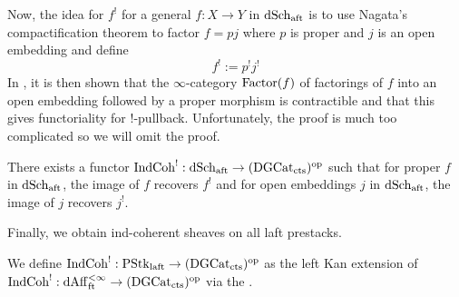 \documentclass[./main.tex]{subfiles}
\begin{document}
Now, the idea for $f^!$ for a general $f : X \to Y$ in $\mathrm{dSch}_{\mathrm{aft}}$
is to use Nagata's compactification theorem
\cite[Thm 38.33.8]{stacks} to factor $f = p j$ where
$p$ is proper and $j$ is an open embedding and define \[
  f^! := p^! j^!  
\]
In \cite[Ch 5 , 2.1]{GR1},
it is then shown that the $\infty$-category $\mathrm{Factor}(f)$ of
factorings of $f$ into an open embedding followed by a proper morphism
is contractible and that
this gives functoriality for !-pullback.
Unfortunately, the proof is much too complicated so
we will omit the proof.

\begin{prop}
  
  There exists a functor $\mathrm{IndCoh}^! : \mathrm{dSch}_{\mathrm{aft}} \to (\mathrm{DGCat}_{\mathrm{cts}})^{\mathrm{op}}$
  such that for proper $f$ in $\mathrm{dSch}_{\mathrm{aft}}$,
  the image of $f$ recovers $f^!$ and for open embeddings $j$ in $\mathrm{dSch}_{\mathrm{aft}}$,
  the image of $j$ recovers $j^!$.
  \cite[Ch 5 , 3.1.4]{GR1}
\end{prop}

Finally, we obtain ind-coherent sheaves on all laft prestacks.

\begin{dfn}
  
  We define $\mathrm{IndCoh}^! : \mathrm{PStk}_{\mathrm{laft}} \to (\mathrm{DGCat}_{\mathrm{cts}})^{\mathrm{op}}$
  as the left Kan extension of 
  $\mathrm{IndCoh}^! : \mathrm{dAff}^{<\infty}_{\mathrm{ft}} \to (\mathrm{DGCat}_{\mathrm{cts}})^{\mathrm{op}}$
  via the .
  \cite[Ch 5 , 3.4.1]{GR1}
\end{dfn}
\end{document}
